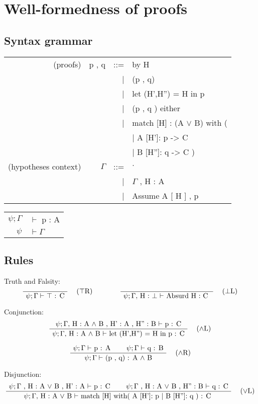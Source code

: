 \documentclass[twoside,a4paper]{article}
\theoremstyle{definition}
\begin{document}
\section{Well-formedness of proofs}
\subsection{Syntax grammar}
\begin{center}
\begin{tabular}{rrrl}
(proofs)& p , q &::=& by H
\\ &&|& (p , q)
\\ &&|& let (H',H'') = H in p
\\ &&|& (p , q ) either
\\ &&|& match [H] : (A $\vee$ B) with (
\\ &&&\qquad \qquad | A [H']: p -> C
\\ &&&\qquad \qquad | B [H'']: q -> C )
\\
(hypotheses context)& $\Gamma$ &::=& \quad $\cdot$ \quad
\\ &&| & $\Gamma$ , H : A
\\ &&| & Assume A [ H ] , p
\end{tabular}

\begin{tabular} {rl}
$\psi ; \Gamma$ &$\vdash$ p : A
\\
$\psi $ & $\vdash \Gamma$
\end{tabular}
\end{center}

\subsection{Rules}
Truth and Falsity:
\[
\AxiomC{}
\RightLabel{\quad ($\top$R)}
\UnaryInfC{$\psi ; \Gamma \vdash$ $\top$ : C}
\DisplayProof
\qquad
\qquad
\AxiomC{}
\RightLabel{\quad ($\bot$L)}
\UnaryInfC{$\psi ; \Gamma ,$  H : $\bot$
$\vdash $
Absurd H : C
}
\DisplayProof
\]

Conjunction:
\[
\AxiomC{$\psi ; \Gamma ,$ H : A $\wedge$ B , H' : A , H'' : B
$\vdash$ p : C}
\RightLabel{\quad ($\wedge$L)}
\UnaryInfC{$\psi ; \Gamma ,$ H : A $\wedge$ B $\vdash$
let (H',H'') = H in p : C}
\DisplayProof
\]

\[
\AxiomC{$\psi ; \Gamma \vdash$ p : A}
\AxiomC{$\psi ; \Gamma \vdash$ q : B}
\RightLabel{\quad ($\wedge$R)}
\BinaryInfC{$\psi ; \Gamma \vdash$ (p , q) : A $\wedge$ B}
\DisplayProof
\]

Disjunction:
\[
\AxiomC{$\psi ; \Gamma$ , H : A $ \vee$ B , H' : A $\vdash$ p : C}
\AxiomC{$\psi ; \Gamma$ , H : A $ \vee$ B , H'' : B $\vdash$ q : C}
\RightLabel{\quad ($\vee$L)}
\BinaryInfC{$\psi ; \Gamma ,$  H : A
$ \vee$ B $\vdash $
 match [H] with(
 A [H']: p
 | B [H'']: q ) : C
}
\DisplayProof
\]
\end{document}
